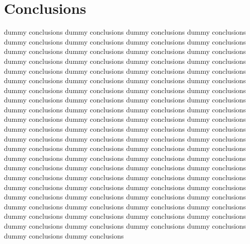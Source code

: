 \section{Conclusions}

 dummy conclusions dummy conclusions dummy conclusions dummy conclusions dummy conclusions dummy conclusions dummy conclusions dummy conclusions dummy conclusions dummy conclusions dummy conclusions dummy conclusions dummy conclusions dummy conclusions dummy conclusions dummy conclusions dummy conclusions dummy conclusions dummy conclusions dummy conclusions dummy conclusions dummy conclusions dummy conclusions dummy conclusions dummy conclusions dummy conclusions dummy conclusions dummy conclusions dummy conclusions dummy conclusions dummy conclusions dummy conclusions dummy conclusions dummy conclusions dummy conclusions dummy conclusions dummy conclusions dummy conclusions dummy conclusions dummy conclusions dummy conclusions dummy conclusions dummy conclusions dummy conclusions dummy conclusions dummy conclusions dummy conclusions dummy conclusions dummy conclusions dummy conclusions dummy conclusions dummy conclusions dummy conclusions dummy conclusions dummy conclusions dummy conclusions dummy conclusions dummy conclusions dummy conclusions dummy conclusions dummy conclusions dummy conclusions dummy conclusions dummy conclusions dummy conclusions dummy conclusions dummy conclusions dummy conclusions dummy conclusions dummy conclusions dummy conclusions dummy conclusions dummy conclusions dummy conclusions dummy conclusions dummy conclusions dummy conclusions dummy conclusions dummy conclusions dummy conclusions dummy conclusions dummy conclusions dummy conclusions dummy conclusions dummy conclusions dummy conclusions

\newpage